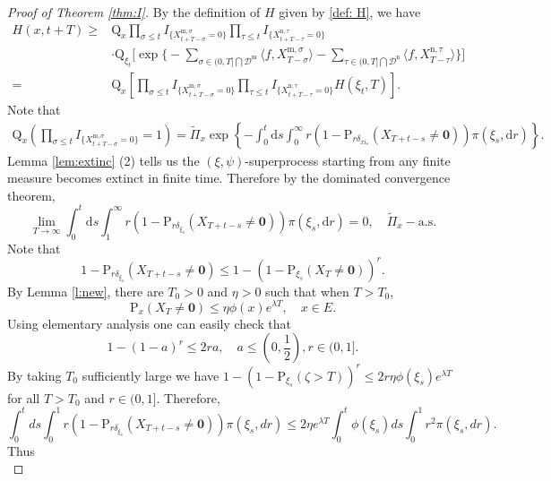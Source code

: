 \documentclass[12pt,a4paper]{amsart}
\numberwithin{equation}{section}
\theoremstyle{plain}
\theoremstyle{definition}
\theoremstyle{remark}
\begin{document}
\begin{proof}[Proof of Theorem \ref{thm:I}]
By the definition of $H$ given by \eqref{def: H},  we have
\begin{equation}\label{subsub}
\begin{aligned}
     H(x,t+T)\geq& \mathrm Q_{x}\prod_{\sigma\leq t}I_{\{ X_{t+T-\sigma}^{{\mathrm m},\sigma}=0\}}\prod_{\tau\leq t}I_{\{ X_{t+T-\tau}^{{\mathrm n},\tau}=0\}}\\
&\cdot\mathrm Q_{\xi_t}\Big[\exp\Big\{-\sum_{\sigma\in (0, T]\bigcap \mathcal D^{\mathrm m}}\langle f, X_{T-\sigma}^{{\mathrm m},\sigma}\rangle -\sum_{\tau\in (0, T]\bigcap \mathcal D^{\mathrm n}}\langle f, X_{T-\tau}^{{\mathrm n},\tau}\rangle \Big\}\Big]\\
=& \mathrm Q_{x}\left[\prod_{\sigma\leq t}I_{\{ X_{t+T-\sigma}^{{\mathrm m},\sigma}=0\}}\prod_{\tau\leq t}I_{\{ X_{t+T-\tau}^{{\mathrm n},\tau}=0\}}H(\xi_t, T)\right].
\end{aligned}
\end{equation}
Note that
\begin{eqnarray*}
\mathrm Q_{x}\left(\prod_{\sigma\leq t}I_{\{ X_{t+T-\sigma}^{{\mathrm m},\sigma}=0\}}=1\right)
=\widetilde\Pi_x\exp\left\{-\int_0^t\mathrm ds\int_0^\infty r(1-\mathrm P_{r\delta_{xi_s}}(X_{T+t-s}\neq\mathbf 0))\pi(\xi_s,\mathrm dr)\right\}.
\end{eqnarray*}
Lemma \ref{lem:extinc} (2) tells us the $(\xi,\psi)$-superprocess starting from any finite measure becomes extinct in finite time.  Therefore
 by the dominated convergence theorem,
\begin{equation}\label{1infty limit}
\lim_{T\rightarrow\infty}\int_0^t\mathrm ds\int_1^\infty r(1-\mathrm P_{r\delta_{\xi_s}}(X_{T+t-s}\neq\mathbf 0))\pi(\xi_s,\mathrm dr)=0,\quad \widetilde\Pi_x-\mbox{a.s.}
\end{equation}
  Note that
\[
1-\mathrm P_{r\delta_{\xi_s}}(X_{T+t-s}\neq\mathbf 0)\leq 1-(1-\mathrm P_{\xi_s}(X_T\neq\mathbf 0))^r.
\]
By Lemma \ref{l:new},
there are $T_0>0$ and $\eta>0$ such that when $T>T_0$,
\[
\mathrm P_x(X_T\neq \mathbf 0)\leq \eta \phi(x)e^{\lambda T}, \quad x\in E.
\]
Using elementary analysis one can easily check that
$$
1-(1-a)^r\le 2 ra, \quad a\le (0, \frac12), r\in (0, 1].
$$
By taking $T_0$  sufficiently large we have
$1-(1-\mathrm P_{\xi_s}(\zeta>T))^r\leq 2r\eta \phi(\xi_s)e^{\lambda T}$ for all  $T>T_0$ and $r\in(0,1]$.
Therefore,
\[
\int_0^tds\int_0^1 r(1-\mathrm P_{r\delta_{ \xi_s}}(X_{T+t-s}\neq \mathbf 0))\pi(\xi_s,dr)\leq 2\eta e^{\lambda T}\int_0^t\phi(\xi_s)ds\int_0^1 r^2 \pi(\xi_s,dr).
\]
Thus
\begin{equation}\label{01limit}

\end{equation}
\end{proof}
\end{document}
